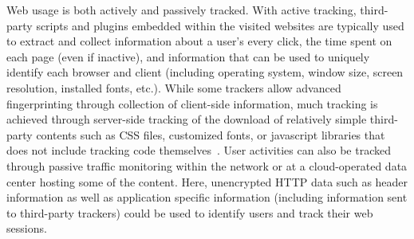 \documentclass[letterpaper]{sig-alternate-10pt}
\begin{document}
Web usage is both actively and passively tracked.  With active tracking, 
third-party scripts and plugins embedded within the visited websites
are typically used to extract and collect information about a user's every click, 
the time spent on each page (even if inactive), and information
that can be used to uniquely identify each browser and client
(including operating system, window size, screen resolution, installed fonts, etc.).
While some trackers allow advanced fingerprinting through collection of client-side information,
much tracking is achieved through server-side tracking of the download of
relatively simple third-party contents such as CSS files, customized fonts, 
or javascript libraries that does not include tracking code themselves~\cite{AEE+14,MPS+13,MaMi12,RoKW12,NIK+12}.  
User activities can also be 
tracked through 
passive traffic monitoring within the network or at a cloud-operated data center hosting some of the content.
Here, unencrypted HTTP data such as header information 
as well as application specific information (including information sent to third-party trackers)
could be used to identify users and track their web sessions.
\end{document}
